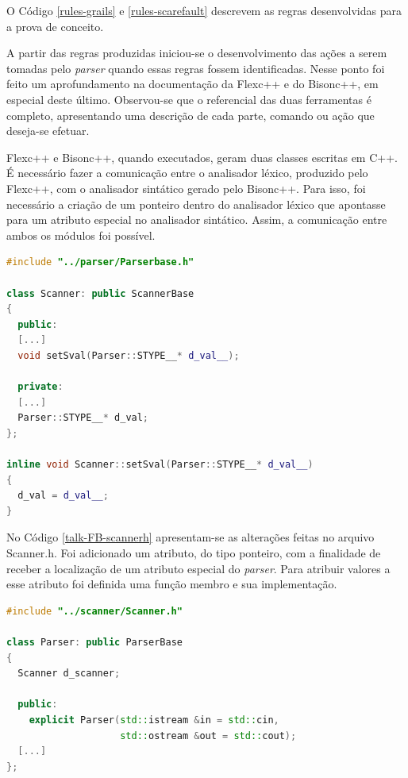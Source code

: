 \par
\indent O Código \ref{rules-grails} e \ref{rules-scarefault} descrevem as regras desenvolvidas para a prova de conceito.
\par
\indent A partir das regras produzidas iniciou-se o desenvolvimento das ações a serem tomadas pelo \textit{parser} quando essas regras fossem identificadas. Nesse ponto foi feito um aprofundamento na documentação da Flexc++ e do Bisonc++, em especial deste último. Observou-se que o referencial das duas ferramentas é completo, apresentando uma descrição de cada parte, comando ou ação que deseja-se efetuar.
\par
\indent Flexc++ e Bisonc++, quando executados, geram duas classes escritas em C++. É necessário fazer a comunicação entre o analisador léxico, produzido pelo Flexc++, com o analisador sintático gerado pelo Bisonc++. Para isso, foi necessário a criação de um ponteiro dentro do analisador léxico que apontasse para um atributo especial no analisador sintático. Assim, a comunicação entre ambos os módulos foi possível.
\begin{lstlisting}[language=C++, label=talk-FB-scannerh, caption=Alterações no Scannner.h para comunicação entre Analisador Léxico e Sintático]
#include "../parser/Parserbase.h"

class Scanner: public ScannerBase
{
  public:
  [...]
  void setSval(Parser::STYPE__* d_val__);
  
  private:
  [...]
  Parser::STYPE__* d_val;
};

inline void Scanner::setSval(Parser::STYPE__* d_val__)
{
  d_val = d_val__;
}
\end{lstlisting}
\par
\indent No Código \ref{talk-FB-scannerh} apresentam-se as alterações feitas no arquivo Scanner.h. Foi adicionado um atributo, do tipo ponteiro, com a finalidade de receber a localização de um atributo especial do \textit{parser}. Para atribuir valores a esse atributo foi definida uma função membro e sua implementação.
\par
\begin{lstlisting}[language=C++, label=talk-FB-parserh, caption=Alterações no Parser.h para comunicação entre Analisador Léxico e Sintático]
#include "../scanner/Scanner.h"

class Parser: public ParserBase
{
  Scanner d_scanner;
  
  public:
    explicit Parser(std::istream &in = std::cin,
                    std::ostream &out = std::cout);
  [...]
};

\end{lstlisting}

